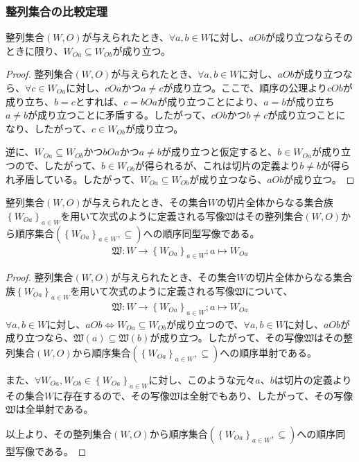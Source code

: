 \documentclass[dvipdfmx]{jsarticle}
\begin{document}
\subsubsection{整列集合の比較定理}%
\begin{thm}\label{1.3.2.12}
整列集合$(W,O)$が与えられたとき、$\forall a,b \in W$に対し、$aOb$が成り立つならそのときに限り、$W_{Oa} \subseteq W_{Ob}$が成り立つ。
\end{thm}
\begin{proof}
整列集合$(W,O)$が与えられたとき、$\forall a,b \in W$に対し、$aOb$が成り立つなら、$\forall c \in W_{Oa}$に対し、$cOa$かつ$a \neq c$が成り立つ。ここで、順序の公理より$cOb$が成り立ち、$b = c$とすれば、$c = bOa$が成り立つことにより、$a = b$が成り立ち$a \neq b$が成り立つことに矛盾する。したがって、$cOb$かつ$b \neq c$が成り立つことになり、したがって、$c \in W_{Ob}$が成り立つ。\par
逆に、$W_{Oa} \subseteq W_{Ob}$かつ$bOa$かつ$a \neq b$が成り立つと仮定すると、$b \in W_{Oa}$が成り立つので、したがって、$b \in W_{Ob}$が得られるが、これは切片の定義より$b \neq b$が得られ矛盾している。したがって、$W_{Oa} \subseteq W_{Ob}$が成り立つなら、$aOb$が成り立つ。
\end{proof}
\begin{thm}\label{1.3.2.13}
整列集合$(W,O)$が与えられたとき、その集合$W$の切片全体からなる集合族$\left\{ W_{Oa} \right\}_{a \in W}$を用いて次式のように定義される写像$\mathfrak{W}$はその整列集合$(W,O)$から順序集合$\left( \left\{ W_{Oa} \right\}_{a \in W}, \subseteq \right)$への順序同型写像である。
\begin{align*}
\mathfrak{W:}W \rightarrow \left\{ W_{Oa} \right\}_{a \in W};a \mapsto W_{Oa}
\end{align*}
\end{thm}
\begin{proof}
整列集合$(W,O)$が与えられたとき、その集合$W$の切片全体からなる集合族$\left\{ W_{Oa} \right\}_{a \in W}$を用いて次式のように定義される写像$\mathfrak{W}$について、
\begin{align*}
\mathfrak{W:}W \rightarrow \left\{ W_{Oa} \right\}_{a \in W};a \mapsto W_{Oa}
\end{align*}
$\forall a,b \in W$に対し、$aOb \Leftrightarrow W_{Oa} \subseteq W_{Ob}$が成り立つので、$\forall a,b \in W$に対し、$aOb$が成り立つなら、$\mathfrak{W}(a)\subseteq \mathfrak{W}(b)$が成り立つ。したがって、その写像$\mathfrak{W}$はその整列集合$(W,O)$から順序集合$\left( \left\{ W_{Oa} \right\}_{a \in W}, \subseteq \right)$への順序単射である。\par
また、$\forall W_{Oa},W_{Ob} \in \left\{ W_{Oa} \right\}_{a \in W}$に対し、このような元々$a$、$b$は切片の定義よりその集合$W$に存在するので、その写像$\mathfrak{W}$は全射でもあり、したがって、その写像$\mathfrak{W}$は全単射である。\par
以上より、その整列集合$(W,O)$から順序集合$\left( \left\{ W_{Oa} \right\}_{a \in W}, \subseteq \right)$への順序同型写像である。
\end{proof}
\end{document}
